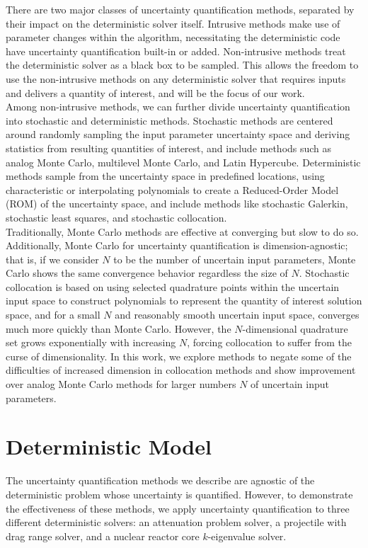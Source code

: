 \documentclass[11pt]{article}
\begin{document}
There are two major classes of uncertainty quantification methods, separated by their impact on the deterministic solver itself.  Intrusive methods make use of parameter changes within the algorithm, necessitating the deterministic code have uncertainty quantification built-in or added.  Non-intrusive methods treat the deterministic solver as a black box to be sampled.  This allows the freedom to use the non-intrusive methods on any deterministic solver that requires inputs and delivers a quantity of interest, and will be the focus of our work.\\

Among non-intrusive methods, we can further divide uncertainty quantification into stochastic and deterministic methods.  Stochastic methods are centered around randomly sampling the input parameter uncertainty space and deriving statistics from resulting quantities of interest, and include methods such as analog Monte Carlo, multilevel Monte Carlo, and Latin Hypercube.  Deterministic methods sample from the uncertainty space in predefined locations, using characteristic or interpolating polynomials to create a Reduced-Order Model (ROM) of the uncertainty space, and include methods like stochastic Galerkin, stochastic least squares, and stochastic collocation. \\

Traditionally, Monte Carlo methods are effective at converging but slow to do so.  Additionally, Monte Carlo for uncertainty quantification is dimension-agnostic; that is, if we consider $N$ to be the number of uncertain input parameters, Monte Carlo shows the same convergence behavior regardless the size of $N$.  Stochastic collocation is based on using selected quadrature points within the uncertain input space to construct polynomials to represent the quantity of interest solution space, and for a small $N$ and reasonably smooth uncertain input space, converges much more quickly than Monte Carlo.  However, the $N$-dimensional quadrature set grows exponentially with increasing $N$, forcing collocation to suffer from the curse of dimensionality.  In this work, we explore methods to negate some of the difficulties of increased dimension in collocation methods and show improvement over analog Monte Carlo methods for larger numbers $N$ of uncertain input parameters.

\section{Deterministic Model}
The uncertainty quantification methods we describe are agnostic of the deterministic problem whose uncertainty is quantified.  However, to demonstrate the effectiveness of these methods, we apply uncertainty quantification to three different deterministic solvers: an attenuation problem solver, a projectile with drag range solver, and a nuclear reactor core $k$-eigenvalue solver.
\end{document}

